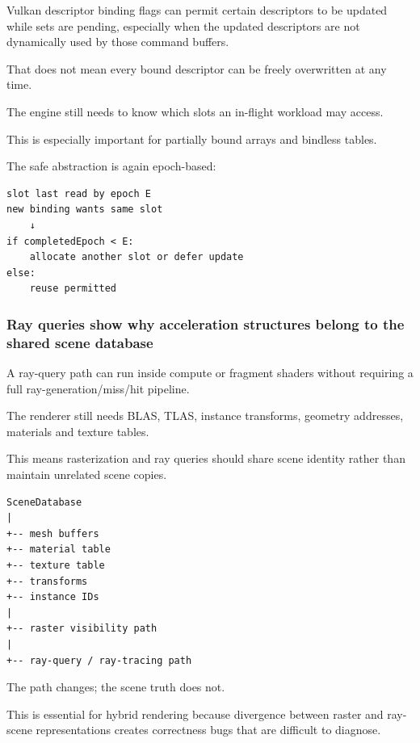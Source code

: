 Vulkan descriptor binding flags can permit certain descriptors to be updated while sets are pending, especially when the updated descriptors are not dynamically used by those command buffers.

That does not mean every bound descriptor can be freely overwritten at any time.

The engine still needs to know which slots an in-flight workload may access.

This is especially important for partially bound arrays and bindless tables.

The safe abstraction is again epoch-based:

\begin{verbatim}
slot last read by epoch E
new binding wants same slot
    ↓
if completedEpoch < E:
    allocate another slot or defer update
else:
    reuse permitted
\end{verbatim}

\subsubsection{Ray queries show why acceleration structures belong to the shared scene database}\label{05-engine-i-ch023-ray-queries-show-why-acceleration-structures-belong-to-the-shared-scene-database}

\hypertarget{05-engine-i-ch023-ray-queries-show-why-acceleration-structures-belong-to-the-shared-scene-database}{}

A ray-query path can run inside compute or fragment shaders without requiring a full ray-generation/miss/hit pipeline.

The renderer still needs BLAS, TLAS, instance transforms, geometry addresses, materials and texture tables.

This means rasterization and ray queries should share scene identity rather than maintain unrelated scene copies.

\begin{verbatim}
SceneDatabase
|
+-- mesh buffers
+-- material table
+-- texture table
+-- transforms
+-- instance IDs
|
+-- raster visibility path
|
+-- ray-query / ray-tracing path
\end{verbatim}

The path changes; the scene truth does not.

This is essential for hybrid rendering because divergence between raster and ray-scene representations creates correctness bugs that are difficult to diagnose.

